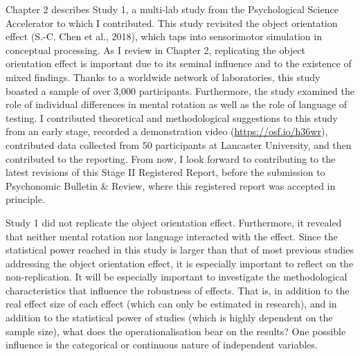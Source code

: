 \documentclass[
  12pt,
  man,floatsintext]{apa7}
\begin{document}
Chapter 2 describes Study 1, a multi-lab study from the Psychological Science Accelerator to which I contributed. This study revisited the object orientation effect (S.-C. Chen et al., 2018), which taps into sensorimotor simulation in conceptual processing. As I review in Chapter 2, replicating the object orientation effect is important due to its seminal influence and to the existence of mixed findings. Thanks to a worldwide network of laboratories, this study boasted a sample of over 3,000 participants. Furthermore, the study examined the role of individual differences in mental rotation as well as the role of language of testing. I contributed theoretical and methodological suggestions to this study from an early stage, recorded a demonstration video (\url{https://osf.io/h36wr}), contributed data collected from 50 participants at Lancaster University, and then contributed to the reporting. From now, I look forward to contributing to the latest revisions of this Stage II Registered Report, before the submission to Psychonomic Bulletin \& Review, where this registered report was accepted in principle.

Study 1 did not replicate the object orientation effect. Furthermore, it revealed that neither mental rotation nor language interacted with the effect. Since the statistical power reached in this study is larger than that of most previous studies addressing the object orientation effect, it is especially important to reflect on the non-replication. It will be especially important to investigate the methodological characteristics that influence the robustness of effects. That is, in addition to the real effect size of each effect (which can only be estimated in research), and in addition to the statistical power of studies (which is highly dependent on the sample size), what does the operationalisation bear on the results? One possible influence is the categorical or continuous nature of independent variables.
\end{document}
